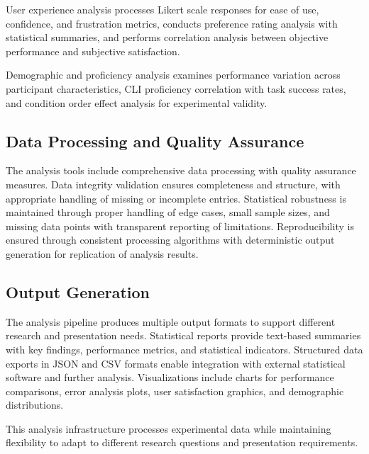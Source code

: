 User experience analysis processes Likert scale responses for ease of use, confidence, and frustration metrics, conducts preference rating analysis with statistical summaries, and performs correlation analysis between objective performance and subjective satisfaction.

Demographic and proficiency analysis examines performance variation across participant characteristics, CLI proficiency correlation with task success rates, and condition order effect analysis for experimental validity.

\subsection{Data Processing and Quality Assurance}

The analysis tools include comprehensive data processing with quality assurance measures. Data integrity validation ensures completeness and structure, with appropriate handling of missing or incomplete entries. Statistical robustness is maintained through proper handling of edge cases, small sample sizes, and missing data points with transparent reporting of limitations. Reproducibility is ensured through consistent processing algorithms with deterministic output generation for replication of analysis results.

\subsection{Output Generation}

The analysis pipeline produces multiple output formats to support different research and presentation needs. Statistical reports provide text-based summaries with key findings, performance metrics, and statistical indicators. Structured data exports in JSON and CSV formats enable integration with external statistical software and further analysis. Visualizations include charts for performance comparisons, error analysis plots, user satisfaction graphics, and demographic distributions.

This analysis infrastructure processes experimental data while maintaining flexibility to adapt to different research questions and presentation requirements.
